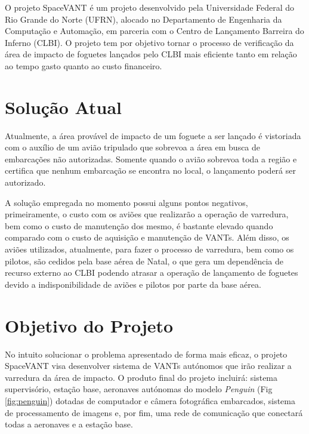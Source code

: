 \label{Cap:SpaceVANT}

O projeto SpaceVANT é um projeto desenvolvido pela Universidade Federal do Rio Grande do Norte (UFRN), alocado no Departamento de Engenharia da Computação e Automação, em parceria com o Centro de Lançamento Barreira do Inferno (CLBI). O projeto tem por objetivo tornar o processo de verificação da área de impacto de foguetes lançados pelo CLBI mais eficiente tanto em relação ao tempo gasto quanto ao custo financeiro.

\section{Solução Atual}

Atualmente, a área provável de impacto de um foguete a ser lançado é vistoriada com o auxílio de um avião tripulado que sobrevoa a área em busca de embarcações não autorizadas. Somente quando o avião sobrevoa toda a região e certifica que nenhum embarcação se encontra no local, o lançamento poderá ser autorizado.

A solução empregada no momento possui alguns pontos negativos, primeiramente, o custo com os aviões que realizarão a operação de varredura, bem como o custo de manutenção dos mesmo, é bastante elevado quando comparado com o custo de aquisição e manutenção de VANTs. Além disso, os aviões utilizados, atualmente, para fazer o processo de varredura, bem como os pilotos, são cedidos pela base aérea de Natal, o que gera um dependência de recurso externo ao CLBI podendo atrasar a operação de lançamento de foguetes devido a indisponibilidade de aviões e pilotos por parte da base aérea. 

\section{Objetivo do Projeto}


No intuito solucionar o problema apresentado de forma mais eficaz, o projeto SpaceVANT visa desenvolver sistema de VANTs autónomos que irão realizar a varredura da área de impacto. O produto final do projeto incluirá: sistema supervisório, estação base, aeronaves autónomas do modelo \emph{Penguin} (Fig \ref{fig:penguin}) dotadas de computador e câmera fotográfica embarcados, sistema de processamento de imagens e, por fim, uma rede de comunicação que conectará todas a aeronaves e a estação base. 

